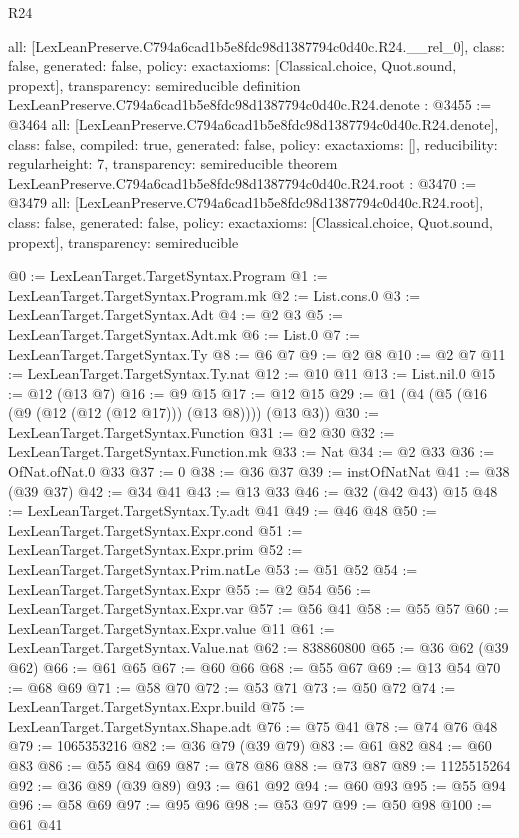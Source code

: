 \begin{lexlean}{R24}
\begin{coremodule}
{  all: [LexLeanPreserve.C794a6cad1b5e8fdc98d1387794c0d40c.R24.__rel_0],
  class: false,
  generated: false,
  policy: exact{axioms: [Classical.choice, Quot.sound, propext]},
  transparency: semireducible
}
definition LexLeanPreserve.C794a6cad1b5e8fdc98d1387794c0d40c.R24.denote : @3455 := @3464 {
  all: [LexLeanPreserve.C794a6cad1b5e8fdc98d1387794c0d40c.R24.denote],
  class: false,
  compiled: true,
  generated: false,
  policy: exact{axioms: []},
  reducibility: regular{height: 7},
  transparency: semireducible
}
theorem LexLeanPreserve.C794a6cad1b5e8fdc98d1387794c0d40c.R24.root : @3470 := @3479 {
  all: [LexLeanPreserve.C794a6cad1b5e8fdc98d1387794c0d40c.R24.root],
  class: false,
  generated: false,
  policy: exact{axioms: [Classical.choice, Quot.sound, propext]},
  transparency: semireducible
}

@0 := LexLeanTarget.TargetSyntax.Program
@1 := LexLeanTarget.TargetSyntax.Program.mk
@2 := List.cons.{0}
@3 := LexLeanTarget.TargetSyntax.Adt
@4 := @2 @3
@5 := LexLeanTarget.TargetSyntax.Adt.mk
@6 := List.{0}
@7 := LexLeanTarget.TargetSyntax.Ty
@8 := @6 @7
@9 := @2 @8
@10 := @2 @7
@11 := LexLeanTarget.TargetSyntax.Ty.nat
@12 := @10 @11
@13 := List.nil.{0}
@15 := @12 (@13 @7)
@16 := @9 @15
@17 := @12 @15
@29 := @1 (@4 (@5 (@16 (@9 (@12 (@12 (@12 @17))) (@13 @8)))) (@13 @3))
@30 := LexLeanTarget.TargetSyntax.Function
@31 := @2 @30
@32 := LexLeanTarget.TargetSyntax.Function.mk
@33 := Nat
@34 := @2 @33
@36 := OfNat.ofNat.{0} @33
@37 := 0
@38 := @36 @37
@39 := instOfNatNat
@41 := @38 (@39 @37)
@42 := @34 @41
@43 := @13 @33
@46 := @32 (@42 @43) @15
@48 := LexLeanTarget.TargetSyntax.Ty.adt @41
@49 := @46 @48
@50 := LexLeanTarget.TargetSyntax.Expr.cond
@51 := LexLeanTarget.TargetSyntax.Expr.prim
@52 := LexLeanTarget.TargetSyntax.Prim.natLe
@53 := @51 @52
@54 := LexLeanTarget.TargetSyntax.Expr
@55 := @2 @54
@56 := LexLeanTarget.TargetSyntax.Expr.var
@57 := @56 @41
@58 := @55 @57
@60 := LexLeanTarget.TargetSyntax.Expr.value @11
@61 := LexLeanTarget.TargetSyntax.Value.nat
@62 := 838860800
@65 := @36 @62 (@39 @62)
@66 := @61 @65
@67 := @60 @66
@68 := @55 @67
@69 := @13 @54
@70 := @68 @69
@71 := @58 @70
@72 := @53 @71
@73 := @50 @72
@74 := LexLeanTarget.TargetSyntax.Expr.build
@75 := LexLeanTarget.TargetSyntax.Shape.adt
@76 := @75 @41
@78 := @74 @76 @48
@79 := 1065353216
@82 := @36 @79 (@39 @79)
@83 := @61 @82
@84 := @60 @83
@86 := @55 @84 @69
@87 := @78 @86
@88 := @73 @87
@89 := 1125515264
@92 := @36 @89 (@39 @89)
@93 := @61 @92
@94 := @60 @93
@95 := @55 @94
@96 := @58 @69
@97 := @95 @96
@98 := @53 @97
@99 := @50 @98
@100 := @61 @41

\end{coremodule}
\end{lexlean}
